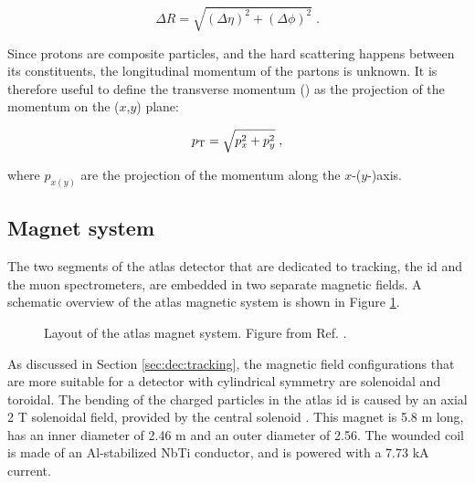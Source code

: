 \begin{equation}
\Delta R = \sqrt{ (\Delta \eta)^2 + (\Delta \phi)^2  } \; . 
\label{eq:cern:dR}
\end{equation}

Since protons are composite particles, and the hard scattering happens between its constituents, the longitudinal momentum of the partons is unknown. It is therefore useful to define the transverse momentum (\pt) as the projection of the momentum on the ($x$,$y$) plane: 

\begin{equation}
p_{\rm T} = \sqrt{p_x^2 + p_y^2} \; , \nonumber
\label{eq:cern:pt}
\end{equation}

\noindent where $p_{x(y)}$ are the projection of the momentum along the $x$-($y$-)axis.



\subsection{Magnet system}
\label{sec:atlas:magnets}

The two segments of the \gls{atlas} detector that are dedicated to tracking, the \gls{id} and the muon spectrometers, are embedded in two separate magnetic fields. A schematic overview of the \gls{atlas} magnetic system is shown in Figure \ref{fig:atlas:magnet}.
\label{sec:cern:atlasmagnets}
\begin{figure}[ht]
\centering
{}
\caption{Layout of the \gls{atlas} magnet system. Figure from Ref. \cite{Goodson}.}
\label{fig:atlas:magnet}
\end{figure}

As discussed in Section \ref{sec:dec:tracking}, the magnetic field configurations that are more suitable for a detector with cylindrical symmetry are solenoidal and toroidal. The bending of the charged particles in the \gls{atlas} \gls{id} is caused by an axial 2 T solenoidal field, provided by the central solenoid \cite{YAMAMOTO200853}. This magnet is 5.8 m long, has an inner diameter of 2.46 m and an outer diameter of 2.56. The wounded coil is made of an Al-stabilized NbTi conductor, and is powered with a 7.73 kA current. 


